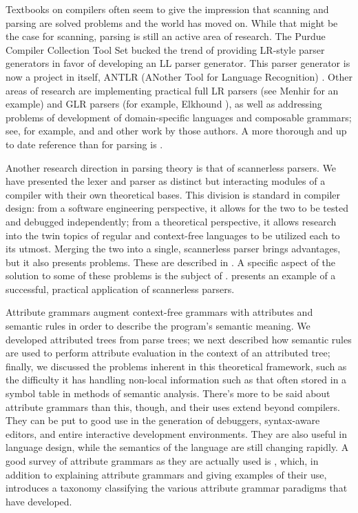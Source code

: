 Textbooks on compilers often seem to give the impression that scanning and parsing are solved problems and the world has moved on. While that might be the case for scanning, parsing is still an active area of research. The Purdue Compiler Collection Tool Set bucked the trend of providing LR-style parser generators in favor of developing an LL parser generator. This parser generator is now a project in itself, ANTLR (ANother Tool for Language Recognition) \citep{Parr:ANTLR:1995}. Other areas of research are implementing practical full LR parsers (see Menhir \citep{Pottier:Menhir:2007} for an example) and GLR parsers (for example, Elkhound \cite{McPeak:Elkhound:2002}), as well as addressing problems of development of domain-specific languages and composable grammars; see, for example, \citet{Wyk:Context-aware:2007} and \citet{Bravenboer:Concrete:2004} and other work by those authors.\nocite{Bravenboer:Preventing:2007} A more thorough and up to date reference than \citet{Aho:Compilers:2006} for parsing is \citet{Grune:Parsing:2007}.

Another research direction in parsing theory is that of scannerless parsers. We have presented the lexer and parser as distinct but interacting modules of a compiler with their own theoretical bases. This division is standard in compiler design: from a software engineering perspective, it allows for the two to be tested and debugged independently; from a theoretical perspective, it allows research into the twin topics of regular and context-free languages to be utilized each to its utmost. Merging the two into a single, scannerless parser brings advantages, but it also presents problems. These are described in \citet{Visser:Scannerless:1997}. A specific aspect of the solution to some of these problems is the subject of \citet{Brand:Disambiguation:2002}. \citet{Bravenboer:Declarative:2006} presents an example of a successful, practical application of scannerless parsers.

Attribute grammars augment context-free grammars with attributes and semantic rules in order to describe the program's semantic meaning. We developed attributed trees from parse trees; we next described how semantic rules are used to perform attribute evaluation in the context of an attributed tree; finally, we discussed the problems inherent in this theoretical framework, such as the difficulty it has handling non-local information such as that often stored in a symbol table in  methods of semantic analysis. There's more to be said about attribute grammars than this, though, and their uses extend beyond compilers. They can be put to good use in the generation of debuggers, syntax-aware editors, and entire interactive development environments. They are also useful in language design, while the semantics of the language are still changing rapidly. A good survey of attribute grammars as they are actually used is \citet{Paakki:Attribute:1995}, which, in addition to explaining attribute grammars and giving examples of their use, introduces a taxonomy classifying the various attribute grammar paradigms that have developed.